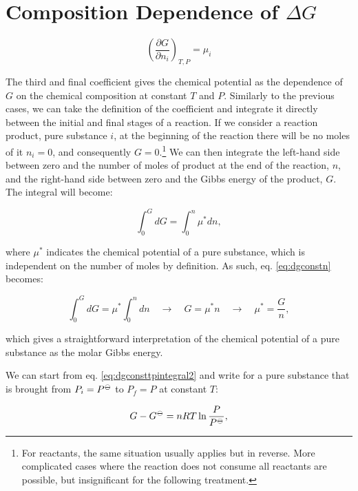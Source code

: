 \documentclass[
  9pt,
]{extbook}
\theoremstyle{definition}
\theoremstyle{definition}
\theoremstyle{definition}
\theoremstyle{definition}
\theoremstyle{remark}
\begin{document}
\section{\texorpdfstring{Composition Dependence of \(\Delta G\)}{Composition Dependence of \textbackslash Delta G}}\label{composition-dependence-of-delta-g}

\[
\left(\frac{\partial G}{\partial n_i} \right)_{T,P}=\mu_i
\]

The third and final coefficient gives the chemical potential as the dependence of \(G\) on the chemical composition at constant \(T\) and \(P\). Similarly to the previous cases, we can take the definition of the coefficient and integrate it directly between the initial and final stages of a reaction. If we consider a reaction product, pure substance \(i\), at the beginning of the reaction there will be no moles of it \(n_i=0\), and consequently \(G=0\).\footnote{For reactants, the same situation usually applies but in reverse. More complicated cases where the reaction does not consume all reactants are possible, but insignificant for the following treatment.} We can then integrate the left-hand side between zero and the number of moles of product at the end of the reaction, \(n\), and the right-hand side between zero and the Gibbs energy of the product, \(G\). The integral will become:

\begin{equation}
\int_0^G d G = \int_0^n \mu^* dn,
\label{eq:dgconstn}
\end{equation}

where \(\mu^*\) indicates the chemical potential of a pure substance, which is independent on the number of moles by definition. As such, eq. \eqref{eq:dgconstn} becomes:

\begin{equation}
\int_0^G d G = \mu^* \int_0^n dn \quad \rightarrow \quad G = \mu^* n \quad \rightarrow \quad \mu^* = \frac{G}{n},
\label{eq:dgconstn1}
\end{equation}

which gives a straightforward interpretation of the chemical potential of a pure substance as the molar Gibbs energy.

We can start from eq. \eqref{eq:dgconsttpintegral2} and write for a pure substance that is brought from \(P_i=P^{-\kern-6pt{\ominus}\kern-6pt-}\) to \(P_f=P\) at constant \(T\):

\begin{equation}
G - G^{-\kern-6pt{\ominus}\kern-6pt-}= nRT \ln \frac{P}{P^{-\kern-6pt{\ominus}\kern-6pt-}},
\label{eq:dgconstn2}
\end{equation}
\end{document}
